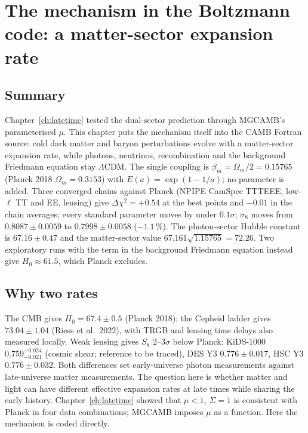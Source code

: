 \providecommand{\authorhold}[1]{\par\smallskip\noindent\fbox{\parbox{0.95\linewidth}{\small\textbf{Author hold.} #1}}\par\smallskip}

\chapter{The mechanism in the Boltzmann code: a matter-sector expansion rate}\label{ch:level2}

\section*{Summary}
Chapter~\ref{ch:latetime} tested the dual-sector prediction through MGCAMB's parameterised $\mu$. This chapter puts the mechanism itself into the CAMB
Fortran source: cold dark matter and baryon perturbations evolve with a matter-sector expansion rate, while photons, neutrinos, recombination and the
background Friedmann equation stay $\Lambda$CDM. The single coupling is $\beta_m=\Omega_m/2=0.15765$ (Planck 2018 $\Omega_m=0.3153$) with
$E(a)=\exp(1-1/a)$; no parameter is added. Three converged chains against Planck (NPIPE CamSpec TTTEEE, low-$\ell$ TT and EE, lensing) give
$\Delta\chi^2=+0.54$ at the best points and $-0.01$ in the chain averages; every standard parameter moves by under $0.1\sigma$; $\sigma_8$ moves from
$0.8087\pm0.0059$ to $0.7998\pm0.0058$ ($-1.1\,\%$). The photon-sector Hubble constant is $67.16\pm0.47$ and the matter-sector value
$67.161\sqrt{1.15765}=72.26$. Two exploratory runs with the term in the background Friedmann equation instead give $H_0\approx61.5$, which Planck excludes.

\section{Why two rates}
The CMB gives $H_0=67.4\pm0.5$ (Planck 2018); the Cepheid ladder gives $73.04\pm1.04$ (Riess et al.\ 2022), with TRGB and lensing time delays also
measured locally. Weak lensing gives $S_8$ 2--3$\sigma$ below Planck: KiDS-1000 $0.759^{+0.024}_{-0.021}$ (cosmic shear; reference to be traced), DES Y3 $0.776\pm0.017$, HSC Y3 $0.776\pm0.032$.
Both differences set early-universe photon measurements against late-universe matter measurements. The question here is whether matter and light can
have different effective expansion rates at late times while sharing the early history. Chapter~\ref{ch:latetime} showed that $\mu<1$, $\Sigma=1$ is
consistent with Planck in four data combinations; MGCAMB imposes $\mu$ as a function. Here the mechanism is coded directly.

